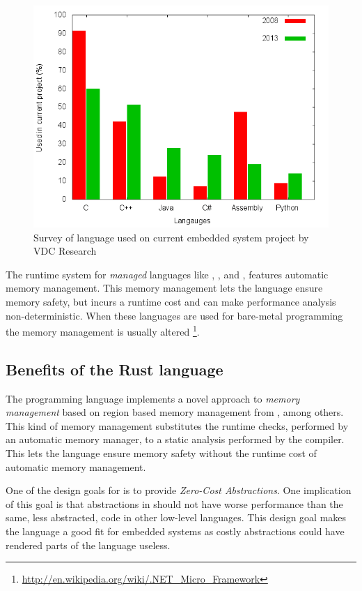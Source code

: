 \begin{figure}[H]
  \begin{center}
    \includegraphics[scale=0.5]{figures/plots/langs.png}
  \end{center}
  \caption{Survey of language used on current embedded system project by VDC Research}
  \label{fig:vdc:langs}
\end{figure}

The runtime system for \emph{managed} languages like {\Java}, , and , features automatic memory management.
This memory management lets the language ensure memory safety, but incurs a runtime cost and can make performance analysis non-deterministic.
When these languages are used for bare-metal programming the memory management is usually altered \cite{PetitBianco} \cite{Pizlo} \footnote{\url{http://en.wikipedia.org/wiki/.NET_Micro_Framework}}.

\subsection{Benefits of the Rust language}
The {\rust} programming language implements a novel approach to \emph{memory management} based on region based memory management from  \cite{Grossman2002,Swamy2006}, among others.
This kind of memory management substitutes the runtime checks, performed by an automatic memory manager, to a static analysis performed by the compiler.
This lets the {\rust} language ensure memory safety without the runtime cost of automatic memory management.

One of the design goals for {\rust} is to provide \emph{Zero-Cost Abstractions}.
One implication of this goal is that abstractions in {\rust} should not have worse performance than the same, less abstracted, code in other low-level languages.
This design goal makes the language a good fit for embedded systems as costly abstractions could have rendered parts of the language useless.

